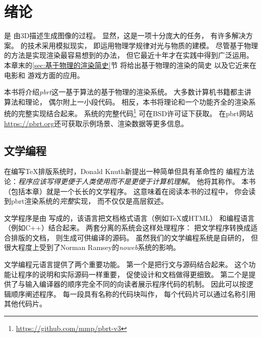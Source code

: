 
\chapter{绪论}\label{chap:绪论}

是
由3D描述生成图像的过程。
显然，这是一项十分庞大的任务，
有许多解决方案。
的技术采用模拟现实，
即运用物理学规律对光与物质的建模。
尽管基于物理的方法是实现渲染最容易想到的办法，
但它最近十年才在实践中得到广泛运用。
本章末的\ref{sec:基于物理的渲染简史}节
将给出基于物理的渲染的简史
以及它近来在电影和
游戏方面的应用。

本书将介绍\emph{pbrt}这一基于算法的基于物理的渲染系统。
大多数计算机书籍都主讲算法和理论，
偶尔附上一小段代码。
相反，本书将理论和一个功能齐全的渲染系统的完整实现结合起来。
系统的完整代码\footnote{\url{https://github.com/mmp/pbrt-v3}}
可在BSD许可证下获取。
在pbrt网站\url{https://pbrt.org}还可获取示例场景、渲染数据等更多信息。


\section{文学编程}\label{sec:文学编程}

在编写\TeX 排版系统时，Donald Knuth新提出一种简单但具有革命性的
编程方法论：\emph{程序应该写得更便于人类使用而不是更便于计算机理解}。
他将其称作。
本书（包括本章）就是一个长长的文学程序。
这意味着在阅读本书的过程中，
你会读到pbrt渲染系统的\emph{完整}实现，
而不仅仅是高层叙述。

文学程序是由
写成的，该语言把文档格式语言（例如\TeX 或HTML）
和编程语言（例如C++）结合起来。
两套分离的系统会这样处理程序：
把文学程序转换成适合排版的文档，
则生成可供编译的源码。
虽然我们的文学编程系统是自研的，
但很大程度上受到了Norman Ramsey的\emph{noweb}系统的影响。

文学编程元语言提供了两个重要功能。
第一个是把行文与源码结合起来。
这个功能让程序的说明和实际源码一样重要，
促使设计和文档做得更细致。
第二个是提供了与输入编译器的顺序完全不同的向读者展示程序代码的机制。
因此可以按逻辑顺序阐述程序。
每一段具有名称的代码块叫作，
每个代码片可以通过名称引用其他代码片。

